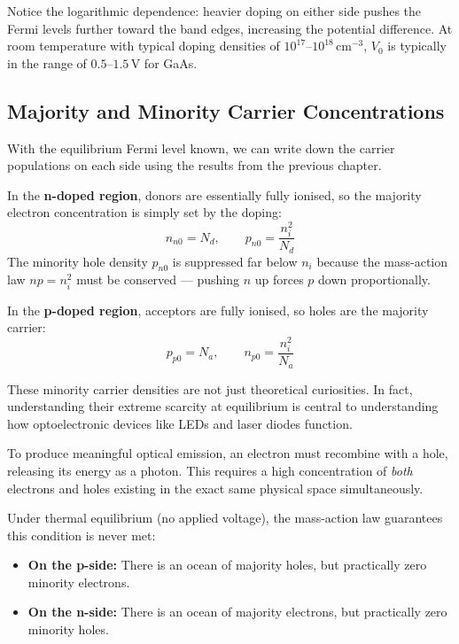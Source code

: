 Notice the logarithmic dependence: heavier doping on either side pushes the Fermi levels further toward the band edges, increasing the potential difference. At room temperature with typical doping densities of $10^{17}$--$10^{18}\,\text{cm}^{-3}$, $V_0$ is typically in the range of $0.5$--$1.5\,\text{V}$ for GaAs.

\subsection{Majority and Minority Carrier Concentrations}

With the equilibrium Fermi level known, we can write down the carrier populations on each side using the results from the previous chapter.

In the \textbf{n-doped region}, donors are essentially fully ionised, so the majority electron concentration is simply set by the doping:
\begin{equation*}
    n_{n0} = N_d, \qquad p_{n0} = \frac{n_i^2}{N_d}
\end{equation*}
The minority hole density $p_{n0}$ is suppressed far below $n_i$ because the mass-action law $np = n_i^2$ must be conserved — pushing $n$ up forces $p$ down proportionally.

In the \textbf{p-doped region}, acceptors are fully ionised, so holes are the majority carrier:
\begin{equation*}
    p_{p0} = N_a, \qquad n_{p0} = \frac{n_i^2}{N_a}
\end{equation*}

These minority carrier densities are not just theoretical curiosities. In fact, understanding their extreme scarcity at equilibrium is central to understanding how optoelectronic devices like LEDs and laser diodes function.

To produce meaningful optical emission, an electron must recombine with a hole, releasing its energy as a photon. This requires a high concentration of \emph{both} electrons and holes existing in the exact same physical space simultaneously.

Under thermal equilibrium (no applied voltage), the mass-action law guarantees this condition is never met:
\begin{itemize}
    \item \textbf{On the p-side:} There is an ocean of majority holes, but practically zero minority electrons.
    \item \textbf{On the n-side:} There is an ocean of majority electrons, but practically zero minority holes.
\end{itemize}

